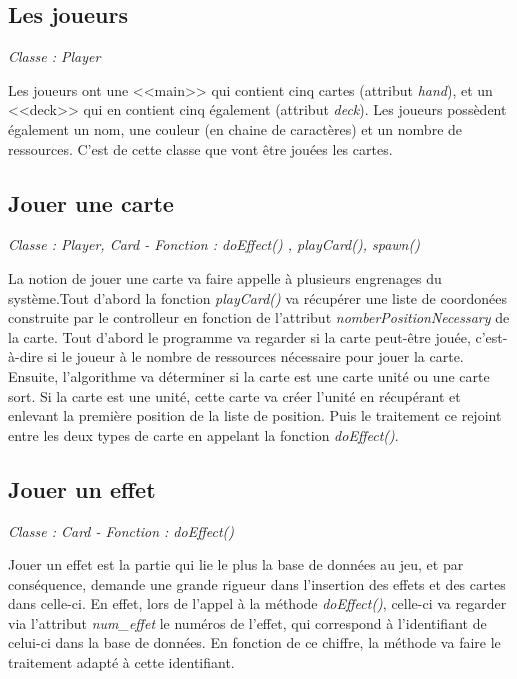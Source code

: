 \documentclass[a4paper,11pt]{report}
\begin{document}
          \subsection{Les joueurs}
            \begin{center}
            \textit{Classe : Player}
            \end{center}
            Les joueurs ont une <<main>> qui contient cinq cartes (attribut \textit{hand}), et un <<deck>> qui en contient cinq également (attribut \textit{deck}). Les joueurs possèdent également un nom,  une couleur (en chaine de caractères) et un nombre de ressources. C'est de cette classe que vont être jouées les cartes.
            
          \subsection{Jouer une carte}
            \begin{center}
            \textit{Classe : Player, Card - Fonction : doEffect() , playCard(),  spawn()}
            \end{center}
            La notion de jouer une carte va faire appelle à plusieurs engrenages du système.Tout d'abord la fonction \textit{playCard()} va récupérer une liste de coordonées construite par le controlleur en fonction de l'attribut \textit{nomberPositionNecessary} de la carte. Tout d'abord le programme va regarder si la carte peut-être jouée, c'est-à-dire si le joueur à le nombre de ressources nécessaire pour jouer la carte. Ensuite, l'algorithme va déterminer si la carte est une carte unité ou une carte sort. Si la carte est une unité, cette carte va créer l'unité en récupérant et enlevant la première position de la liste de position. Puis le traitement ce rejoint entre les deux types de carte en appelant la fonction \textit{doEffect()}.
            
          \subsection{Jouer un effet}
            \begin{center}
            \textit{Classe : Card - Fonction : doEffect()}
            \end{center}
            Jouer un effet est la partie qui lie le plus la base de données au jeu, et par conséquence, demande une grande rigueur dans l'insertion des effets et des cartes dans celle-ci. En effet, lors de l'appel à la méthode \textit{doEffect()}, celle-ci va regarder via l'attribut \textit{num\_effet} le numéros de l'effet, qui correspond à l'identifiant de celui-ci dans la base de données. En fonction de ce chiffre, la méthode va faire le traitement adapté à cette identifiant.
\end{document}
